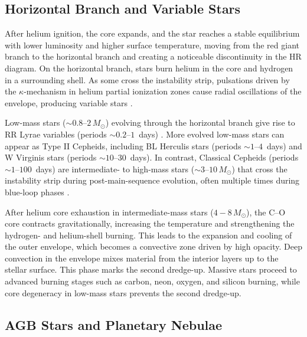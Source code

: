 


\subsection{Horizontal Branch and Variable Stars}



After helium ignition, the core expands, and the star reaches a stable equilibrium with lower luminosity and higher surface temperature, moving from the red giant branch to the horizontal branch and creating a noticeable discontinuity in the HR diagram. On the horizontal branch, stars burn helium in the core and hydrogen in a surrounding shell. As some cross the instability strip, pulsations driven by the $\kappa$-mechanism in helium partial ionization zones cause radial oscillations of the envelope, producing variable stars \citep{CarrollOstlie2017}.







Low-mass stars ($\sim 0.8$--$2\,M_\odot$) evolving through the horizontal branch give rise to RR Lyrae variables (periods $\sim 0.2$--$1$~days) \citep{Smith1995}. More evolved low-mass stars can appear as Type II Cepheids, including BL Herculis stars (periods $\sim 1$--$4$~days) and W Virginis stars (periods $\sim 10$--$30$~days). In contrast, Classical Cepheids (periods $\sim 1$--$100$~days) are intermediate- to high-mass stars ($\sim 3$--$10\,M_\odot$) that cross the instability strip during post-main-sequence evolution, often multiple times during blue-loop phases  \citep{Wallerstein2002}.



After helium core exhaustion in intermediate-mass stars (\(4 - 8\,M_\odot\)), the C–O core contracts gravitationally, increasing the temperature and strengthening the hydrogen- and helium-shell burning. This leads to the expansion and cooling of the outer envelope, which becomes a convective zone driven by high  opacity. Deep convection in the envelope mixes material from the interior layers up to the stellar surface. This phase marks the second dredge-up. Massive stars proceed to advanced burning stages such as carbon, neon, oxygen, and silicon burning, while core degeneracy in low-mass stars prevents the second dredge-up.

\subsection{AGB Stars and Planetary Nebulae}

